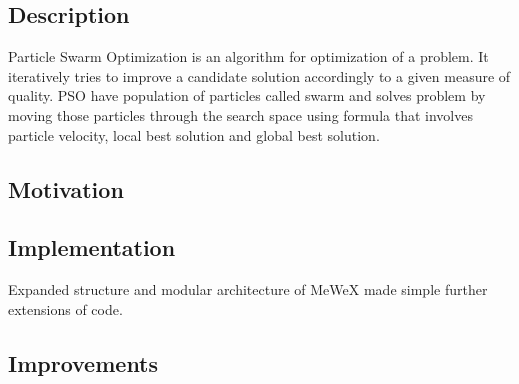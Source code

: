\subsection{Description}
Particle Swarm Optimization is an algorithm for optimization of a problem. It iteratively tries to improve a candidate solution 
accordingly to a given measure of quality. PSO have population of particles called swarm and solves problem by moving those particles 
through the search space using formula that involves particle velocity, local best solution and global best solution.

\subsection{Motivation}

\subsection{Implementation}
Expanded structure and modular architecture of MeWeX made simple further extensions of code. 

\subsection{Improvements}







